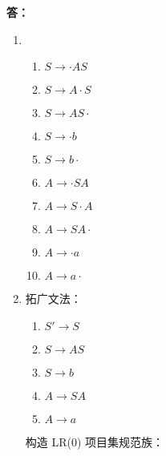 \begin{enumerate}
    \textbf{答：}
    
    \begin{enumerate}
        \item
        \begin{enumerate}[(1)]
            \item $S \to \cdot AS$
            \item $S \to A \cdot S$
            \item $S \to AS \cdot$
            \item $S \to \cdot b$
            \item $S \to b \cdot$
            \item $A \to \cdot SA$
            \item $A \to S \cdot A$
            \item $A \to SA \cdot$
            \item $A \to \cdot a$
            \item $A \to a \cdot$
        \end{enumerate}
        
        \item
        
        拓广文法：

        \begin{enumerate}[(1)]
            \item $S' \to S$
            \item $S \to AS$
            \item $S \to b$
            \item $A \to SA$
            \item $A \to a$
        \end{enumerate}
        
        构造 LR(0) 项目集规范族：
        

\end{enumerate}
\end{enumerate}
